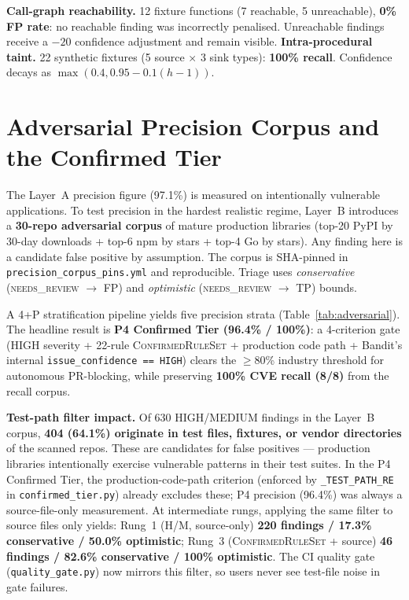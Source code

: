 \textbf{Call-graph reachability.} 12 fixture functions (7 reachable, 5 unreachable), \textbf{0\% FP rate}: no reachable finding was incorrectly penalised. Unreachable findings receive a $-20$ confidence adjustment and remain visible.
\textbf{Intra-procedural taint.} 22 synthetic fixtures (5 source $\times$ 3 sink types): \textbf{100\% recall}. Confidence decays as $\max(0.4, 0.95 - 0.1(h-1))$.

\section{Adversarial Precision Corpus and the Confirmed Tier}
\label{sec:adversarial}

The Layer~A precision figure (97.1\%) is measured on intentionally vulnerable applications. To test precision in the hardest realistic regime, Layer~B introduces a \textbf{30-repo adversarial corpus} of mature production libraries (top-20 PyPI by 30-day downloads + top-6 npm by stars + top-4 Go by stars). Any finding here is a candidate false positive by assumption. The corpus is SHA-pinned in \texttt{precision\_corpus\_pins.yml} and reproducible. Triage uses \textit{conservative} (\textsc{needs\_review} $\to$ FP) and \textit{optimistic} (\textsc{needs\_review} $\to$ TP) bounds.

A 4+P stratification pipeline yields five precision strata (Table~\ref{tab:adversarial}). The headline result is \textbf{P4 Confirmed Tier (96.4\% / 100\%)}: a 4-criterion gate (HIGH severity + 22-rule \textsc{ConfirmedRuleSet} + production code path + Bandit's internal \texttt{issue\_confidence == HIGH}) clears the $\geq$80\% industry threshold for autonomous PR-blocking, while preserving \textbf{100\% CVE recall (8/8)} from the recall corpus.

\textbf{Test-path filter impact.} Of 630 HIGH/MEDIUM findings in the Layer~B corpus, \textbf{404 (64.1\%) originate in test files, fixtures, or vendor directories} of the scanned repos. These are candidates for false positives --- production libraries intentionally exercise vulnerable patterns in their test suites. In the P4 Confirmed Tier, the production-code-path criterion (enforced by \texttt{\_TEST\_PATH\_RE} in \texttt{confirmed\_tier.py}) already excludes these; P4 precision (96.4\%) was always a source-file-only measurement. At intermediate rungs, applying the same filter to source files only yields: Rung~1 (H/M, source-only) \textbf{220 findings / 17.3\% conservative / 50.0\% optimistic}; Rung~3 (\textsc{ConfirmedRuleSet} + source) \textbf{46 findings / 82.6\% conservative / 100\% optimistic}. The CI quality gate (\texttt{quality\_gate.py}) now mirrors this filter, so users never see test-file noise in gate failures.

